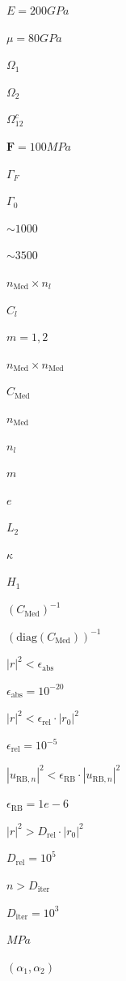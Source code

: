 \documentclass{article}
\begin{document}
$E = 200 GPa$
\pagebreak

$\mu = 80 GPa$
\pagebreak

$\Omega_1$
\pagebreak

$\Omega_2$
\pagebreak

$\Omega_{12}^c$
\pagebreak

$\mathbf{F}=100 MPa$
\pagebreak

$\Gamma_F$
\pagebreak

$\Gamma_0$
\pagebreak

$\sim1000$
\pagebreak

$\sim3500$
\pagebreak

$ n_{\mbox{Med}} \times n_l$
\pagebreak

$C_l$
\pagebreak

$m = 1,2$
\pagebreak

$ n_{\mbox{Med}} \times n_{\mbox{Med}}$
\pagebreak

$C_{\mbox{Med}}$
\pagebreak

$ n_{\mbox{Med}} $
\pagebreak

$ n_l $
\pagebreak

$ m $
\pagebreak

$e$
\pagebreak

$L_2$
\pagebreak

$\kappa$
\pagebreak

$H_1$
\pagebreak

$(C_{\mbox{Med}})^{-1}$
\pagebreak

$(\mbox{diag}(C_{\mbox{Med}}))^{-1}$
\pagebreak

$ | r |^2 < \epsilon_{\mbox{abs}} $
\pagebreak

$ \epsilon_{\mbox{abs}} = 10^{-20}$
\pagebreak

$ | r |^2 < \epsilon_{\mbox{rel}} \cdot | r_0 |^2 $
\pagebreak

$\epsilon_{\mbox{rel}} = 10^{-5}$
\pagebreak

$ | u_{\mbox{RB},n} |^2 < \epsilon_{\mbox{RB}} \cdot | u_{\mbox{RB},n} |^2 $
\pagebreak

$ \epsilon_{\mbox{RB}} = 1e-6$
\pagebreak

$ | r |^2 > D_{\mbox{rel}} \cdot | r_0 |^2 $
\pagebreak

$ D_{\mbox{rel}} = 10^5$
\pagebreak

$n > D_{\mbox{iter}}$
\pagebreak

$ D_{\mbox{iter}} = 10^3$
\pagebreak

$MPa$
\pagebreak

$(\alpha_1, \alpha_2)$
\pagebreak
\end{document}
